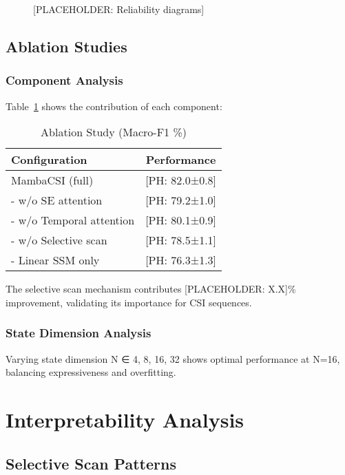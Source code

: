 \documentclass[journal]{IEEEtran}
\begin{document}
\begin{figure}[h]
\centering
\caption{[PLACEHOLDER: Reliability diagrams]}
\label{fig:calibration}
\end{figure}

\subsection{Ablation Studies}

\subsubsection{Component Analysis}
Table~\ref{tab:ablation} shows the contribution of each component:

\begin{table}[h]
\centering
\caption{Ablation Study (Macro-F1 \%)}
\label{tab:ablation}
\begin{tabular}{lc}
\toprule
Configuration & Performance \\
\midrule
MambaCSI (full) & [PH: 82.0±0.8] \\
- w/o SE attention & [PH: 79.2±1.0] \\
- w/o Temporal attention & [PH: 80.1±0.9] \\
- w/o Selective scan & [PH: 78.5±1.1] \\
- Linear SSM only & [PH: 76.3±1.3] \\
\bottomrule
\end{tabular}
\end{table}

The selective scan mechanism contributes [PLACEHOLDER: X.X]\% improvement, validating its importance for CSI sequences.

\subsubsection{State Dimension Analysis}
Varying state dimension N ∈ {4, 8, 16, 32} shows optimal performance at N=16, balancing expressiveness and overfitting.

\section{Interpretability Analysis}

\subsection{Selective Scan Patterns}
\end{document}
